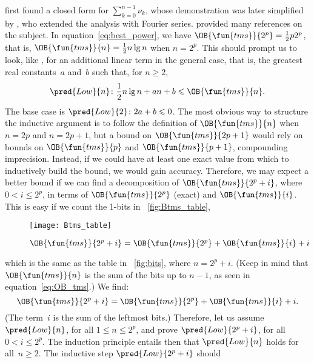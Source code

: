 \noindent \cite{Trollope_1968} first found a closed form for
\(\sum_{k=0}^{n-1}\nu_k\), whose demonstration was later simplified by
\cite{Delange_1975}, who extended the analysis with Fourier
series. \cite{Stolarsky_1977} provided many references on the
subject. In equation~\eqref{eq:best_power}, we have
\(\OB{\fun{tms}}{2^p} = \frac{1}{2}p2^p\), that is,
\(\OB{\fun{tms}}{n} = \frac{1}{2}n\lg n\) when \(n=2^p\). This should
prompt us to look, like \cite{McIlroy_1974}, for an additional linear
term in the general case, that is, the greatest real constants~\(a\)
and~\(b\) such that, for \(n \geqslant 2\),
\begin{equation}
\pred{Low}{n} \colon \frac{1}{2}n\lg n + an + b \leqslant \OB{\fun{tms}}{n}.
\label{ineq:McIlroy}
\end{equation}%
The base case is \(\pred{Low}{2} \colon 2a + b \leqslant 0\). The most
obvious way to structure the inductive argument is to follow the
definition of \(\OB{\fun{tms}}{n}\) when \(n=2p\) and \(n=2p+1\), but
a bound on \(\OB{\fun{tms}}{2p+1}\) would rely on bounds on
\(\OB{\fun{tms}}{p}\) and \(\OB{\fun{tms}}{p+1}\), compounding
imprecision. Instead, if we could have at least one exact value from
which to inductively build the bound, we would gain
accuracy. Therefore, we may expect a better bound if we can find a
decomposition of \(\OB{\fun{tms}}{2^p+i}\), where \(0 < i \leqslant
2^p\), in terms of \(\OB{\fun{tms}}{2^p}\) (exact) and
\(\OB{\fun{tms}}{i}\). This is easy if we count the 1-bits in
\fig~\vref{fig:Btms_table},
\begin{figure}
\centering
\texttt{[image: Btms\_table]}
\caption{$\protect\OB{\fun{tms}}{2^p+i} = \protect\OB{\fun{tms}}{2^p}
  + \protect\OB{\fun{tms}}{i} + i$}
\label{fig:Btms_table}
\end{figure}
which is the same as the table in \fig~\ref{fig:bits}, where
\(n=2^p+i\). (Keep in mind that \(\OB{\fun{tms}}{n}\) is the sum of
the bits up to \(n-1\), as seen in equation~\eqref{eq:OB_tms}.) We
find:
\begin{equation}
\OB{\fun{tms}}{2^p+i} = \OB{\fun{tms}}{2^p} + \OB{\fun{tms}}{i} + i.
\label{eq:OBtms_2m_i}
\end{equation}
(The term~\(i\) is the sum of the leftmost bits.) Therefore, let us
assume \(\pred{Low}{n}\), for all \(1 \leqslant n \leqslant 2^p\), and
prove \(\pred{Low}{2^p+i}\), for all \(0 < i \leqslant 2^p\). The
induction principle entails then that \(\pred{Low}{n}\) holds for
all~\(n \geqslant 2\). The inductive step \(\pred{Low}{2^p+i}\) should
